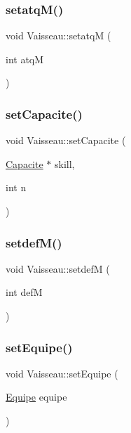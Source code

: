 \subsubsection{\texorpdfstring{setatq\+M()}{setatqM()}}
{\footnotesize\ttfamily void Vaisseau\+::setatqM (\begin{DoxyParamCaption}\item[{int}]{atqM }\end{DoxyParamCaption})\hspace{0.3cm}{\ttfamily [inline]}}

\mbox{\label{class_vaisseau_a3c0b746f19977e3fda48ca2a56937d3e}} 
\subsubsection{\texorpdfstring{set\+Capacite()}{setCapacite()}}
{\footnotesize\ttfamily void Vaisseau\+::set\+Capacite (\begin{DoxyParamCaption}\item[{\hyperlink{class_capacite}{Capacite} $\ast$}]{skill,  }\item[{int}]{n }\end{DoxyParamCaption})\hspace{0.3cm}{\ttfamily [inline]}}

\mbox{\label{class_vaisseau_a4120a8c40229b8af08590ee3a6d00f6a}} 
\subsubsection{\texorpdfstring{setdef\+M()}{setdefM()}}
{\footnotesize\ttfamily void Vaisseau\+::setdefM (\begin{DoxyParamCaption}\item[{int}]{defM }\end{DoxyParamCaption})\hspace{0.3cm}{\ttfamily [inline]}}

\mbox{\label{class_vaisseau_a507c16e2f4584e544178e27f0acc29d9}} 
\subsubsection{\texorpdfstring{set\+Equipe()}{setEquipe()}}
{\footnotesize\ttfamily void Vaisseau\+::set\+Equipe (\begin{DoxyParamCaption}\item[{\hyperlink{constantes_8h_a08fa5554288d5031a8f3bb83cc04ee83}{Equipe}}]{equipe }\end{DoxyParamCaption})\hspace{0.3cm}{\ttfamily [inline]}}

